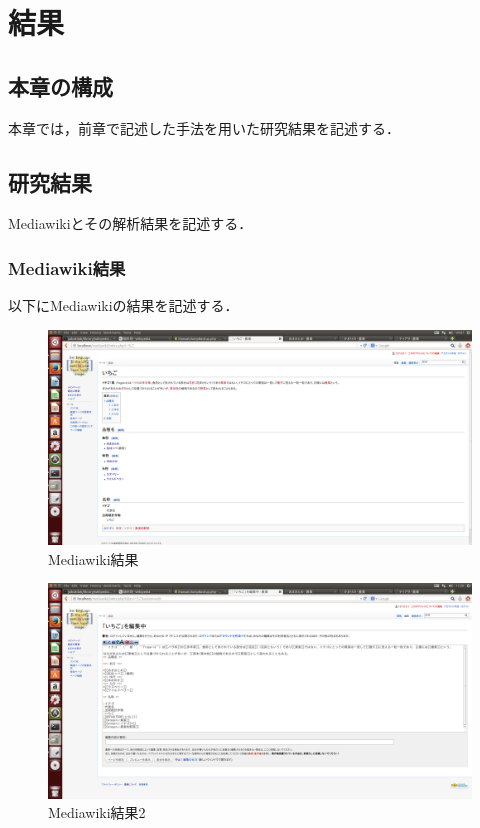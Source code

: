 \chapter{結果}
\section{本章の構成}
本章では，前章で記述した手法を用いた研究結果を記述する．



\section{研究結果}
Mediawikiとその解析結果を記述する．


\subsection{Mediawiki結果}
以下にMediawikiの結果を記述する．
\begin{figure}[!htb]
\centering
\includegraphics[width=18cm]{itigokekka.png}
\caption{Mediawiki結果}\label{itigokekka.png}
\end{figure}

\begin{figure}[!htb]
\centering
\includegraphics[width=18cm]{hensyuuseikou.png}
\caption{Mediawiki結果2}\label{hensyuuseikou.png}
\end{figure}


